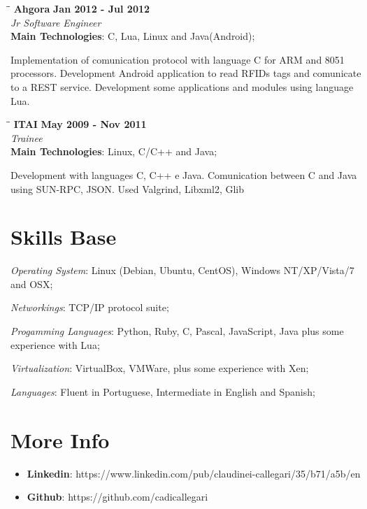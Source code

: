 \documentclass[margin]{res}
\begin{document}
\begin{resume}
   \begin{tabbing}
   \hspace{2.3in}\= \hspace{1.5in}\= \kill %
    \textbf{Ahgora}    \>\>\textbf{Jan 2012 - Jul 2012}\\
    \textit{Jr Software Engineer}\\   
    \textbf{Main Technologies}: C, Lua, Linux and Java(Android);
   \end{tabbing}\vspace{-20pt}      %
    \vspace{2mm}
Implementation of comunication protocol with language C for ARM and 8051 processors.
Development Android application to read RFIDs tags and comunicate to a REST service.
Development some applications and modules using language Lua.

       
   \begin{tabbing}
   \hspace{2.3in}\= \hspace{1.5in}\= \kill %
    \textbf{ITAI}    \>\>\textbf{May 2009 - Nov 2011}\\
    \textit{Trainee}\\   
    \textbf{Main Technologies}: Linux, C/C++ and Java;
   \end{tabbing}\vspace{-20pt}      %
    \vspace{2mm}
       Development with languages C, C++ e Java. Comunication between C and Java using SUN-RPC, JSON. Used Valgrind, Libxml2, Glib

\section{Skills Base}  \textit{Operating System}:  Linux (Debian, Ubuntu, CentOS), Windows NT/XP/Vista/7 and OSX;

      \textit{Networkings}: TCP/IP protocol suite;
  
      \textit{Progamming Languages}: Python, Ruby, C, Pascal, JavaScript, Java plus some experience with Lua;
  
      \textit{Virtualization}: VirtualBox, VMWare, plus some experience with Xen;

      \textit{Languages}: Fluent in Portuguese, Intermediate in English and Spanish;
 
\section{More Info}
    \begin{itemize}
        \item \textbf{Linkedin}: https://www.linkedin.com/pub/claudinei-callegari/35/b71/a5b/en
         \item \textbf{Github}: https://github.com/cadicallegari
    \end{itemize}


\end{resume} 
\end{document}
